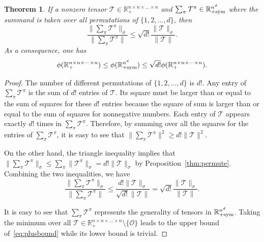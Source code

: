 \documentclass[11pt]{article}
\newtheorem{theorem}{Theorem}[section]
\newcommand{\R}{\mathbb{R}}
\newcommand{\OO}{\mathcal{O}}
\newcommand{\TT}{\mathcal{T}}
\newcommand{\sym}{\textnormal{sym}}
\begin{document}
\begin{theorem} \label{thm:sym2}
If a nonzero tensor $\TT\in\R^{n\times n\times \dots \times n}_+$ and $\sum_\pi\TT^\pi\in\R^{n^d}_{+\sym}$ where the summand is taken over all permutations of $\{1,2,\dots,d\}$, then
$$
\frac{\|\sum_\pi\TT^\pi\|_\sigma}{\|\sum_\pi\TT^\pi\|} \le \sqrt{d!}\frac{\|\TT\|_\sigma}{\|\TT\|}.
$$
As a consequence, one has
\begin{equation}\label{eq:plusbound}
    \phi(\R^{n\times n\times \dots \times n}_+)\le \phi(\R^{n^d}_{+\sym})\le \sqrt{d!}\phi(\R^{n\times n\times \dots \times n}_+).
\end{equation}
\end{theorem}
\begin{proof}
  The number of different permutations of $\{1,2,\dots,d\}$ is $d!$. Any entry of $\sum_\pi\TT^\pi$ is the sum of $d!$ entries of $\TT$. Its square must be larger than or equal to the sum of squares for these $d!$ entries because the square of sum is larger than or equal to the sum of squares for nonnegative numbers. Each entry of $\TT$ appears exactly $d!$ times in $\sum_\pi\TT^\pi$. Therefore, by summing over all the squares for the entries of $\sum_\pi\TT^\pi$, it is easy to see that $\|\sum_\pi\TT^\pi\|^2\ge d!\|\TT\|^2$.

  On the other hand, the triangle inequality implies that $\|\sum_\pi\TT^\pi\|_\sigma\le \sum_\pi \|\TT^\pi\|_\sigma=d!\|\TT\|_\sigma$ by Proposition~\ref{thm:permute}. Combining the two inequalities, we have
  $$
  \frac{\|\sum_\pi\TT^\pi\|_\sigma}{\|\sum_\pi\TT^\pi\|} \le\frac{d!\|\TT\|_\sigma}{\sqrt{d!}\|\TT\|} = \sqrt{d!}\frac{\|\TT\|_\sigma}{\|\TT\|}.
  $$

  It is easy to see that $\sum_\pi\TT^\pi$ represents the generality of tensors in $\R^{n^d}_{+\sym}$. Taking the minimum over all $\TT\in\R^{n\times n\times \dots \times n}_+\setminus\{\OO\}$ leads to the upper bound of~\eqref{eq:plusbound} while its lower bound is trivial.
\end{proof}
\end{document}
